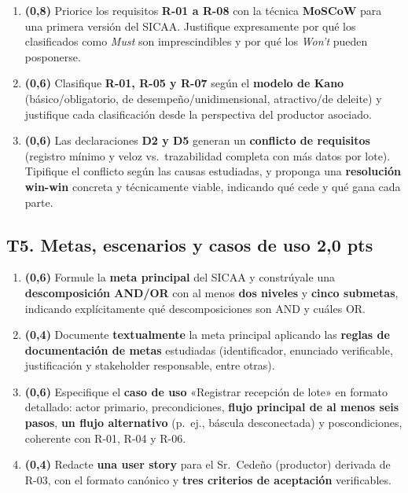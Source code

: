 \documentclass[11pt]{article}
\newcommand{\pts}[1]{\hfill{\normalsize\textbf{\textcolor{utegreendk}{#1 pts}}}}
\begin{document}
\begin{enumerate}[label=\textbf{T4.\arabic*},leftmargin=26pt,itemsep=3pt]
  \item \textbf{(0{,}8)} Priorice los requisitos \textbf{R-01 a R-08} con la técnica \textbf{MoSCoW} para una primera versión del SICAA. Justifique expresamente por qué los clasificados como \emph{Must} son imprescindibles y por qué los \emph{Won't} pueden posponerse.
  \item \textbf{(0{,}6)} Clasifique \textbf{R-01, R-05 y R-07} según el \textbf{modelo de Kano} (básico/obligatorio, de desempeño/unidimensional, atractivo/de deleite) y justifique cada clasificación desde la perspectiva del productor asociado.
  \item \textbf{(0{,}6)} Las declaraciones \textbf{D2 y D5} generan un \textbf{conflicto de requisitos} (registro mínimo y veloz vs.\ trazabilidad completa con más datos por lote). Tipifique el conflicto según las causas estudiadas, y proponga una \textbf{resolución win-win} concreta y técnicamente viable, indicando qué cede y qué gana cada parte.
\end{enumerate}

\subsection*{T5. Metas, escenarios y casos de uso \pts{2{,}0}}

\begin{enumerate}[label=\textbf{T5.\arabic*},leftmargin=26pt,itemsep=3pt]
  \item \textbf{(0{,}6)} Formule la \textbf{meta principal} del SICAA y constrúyale una \textbf{descomposición AND/OR} con al menos \textbf{dos niveles} y \textbf{cinco submetas}, indicando explícitamente qué descomposiciones son AND y cuáles OR.
  \item \textbf{(0{,}4)} Documente \textbf{textualmente} la meta principal aplicando las \textbf{reglas de documentación de metas} estudiadas (identificador, enunciado verificable, justificación y stakeholder responsable, entre otras).
  \item \textbf{(0{,}6)} Especifique el \textbf{caso de uso} «Registrar recepción de lote» en formato detallado: actor primario, precondiciones, \textbf{flujo principal de al menos seis pasos}, \textbf{un flujo alternativo} (p.\ ej., báscula desconectada) y poscondiciones, coherente con R-01, R-04 y R-06.
  \item \textbf{(0{,}4)} Redacte \textbf{una user story} para el Sr.\ Cedeño (productor) derivada de R-03, con el formato canónico y \textbf{tres criterios de aceptación} verificables.
\end{enumerate}
\end{document}
